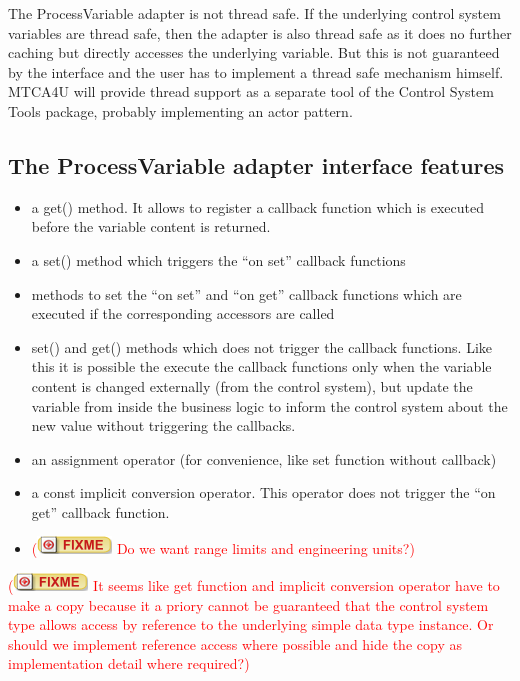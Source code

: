 \documentclass[11pt,a4paper]{scrartcl}
\newcounter{nFixmes}
\newcommand{\fixme}[1]{\addtocounter{nFixmes}{1}\textcolor{red}{(\includegraphics[height=2ex]{fixme} #1)}\xspace}
\begin{document}
The ProcessVariable adapter is not thread safe. If the underlying control
system variables are thread safe, then the adapter is also thread safe as it
does no further caching but directly accesses the underlying variable. But this
is not guaranteed by the interface and the user has to implement a thread safe
mechanism himself. MTCA4U will provide thread support as a separate tool of
the Control System Tools package, probably implementing an actor pattern.

\subsection{The ProcessVariable adapter interface features}
\begin{itemize}
\item a get() method. It allows to register a callback function which is executed before
  the variable content is returned.
\item a set() method which triggers the ``on set'' callback functions
\item methods to set the ``on set'' and ``on get'' callback functions which are executed 
  if the corresponding accessors are called
\item set() and get() methods which does not trigger the callback functions. Like this
  it is possible the execute the callback functions only when the variable
  content is changed externally (from the control system), but update the
  variable from inside the business logic to inform the control system about
  the new value without triggering the callbacks. 
\item an assignment operator (for convenience, like set function without
  callback)
\item a const implicit conversion operator. This operator does not trigger the ``on get'' callback
  function.
\item \fixme{Do we want range limits and engineering units?}
\end{itemize}
\fixme{It seems like get function and implicit conversion operator have to make a copy
  because it a priory cannot be guaranteed that the control system type allows
  access by reference to the underlying simple data type instance. Or should we implement 
  reference access where possible and hide the copy as implementation detail where required?}
\end{document}

